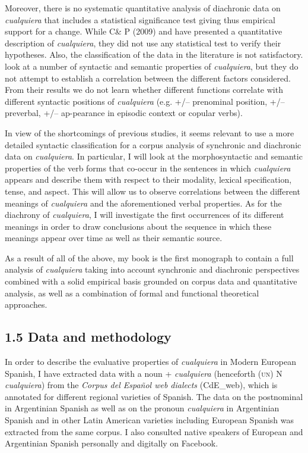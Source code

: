 \documentclass[output=paper]{langscibook}
\begin{document}
  Moreover, there is no systematic quantitative analysis of diachronic data on \textit{cualquiera} that includes a statistical significance test giving thus empirical support for a change. While C\& P (2009) and \citet{AloniPort2013} have presented a quantitative description of \textit{cualquiera}, they did not use any statistical test to verify their hypotheses. Also, the classification of the data in the literature is not satisfactory. \citet{AloniPort2013} look at a number of syntactic and semantic properties of \textit{cualquiera}, but they do not attempt to establish a correlation between the different factors considered. From their results we do not learn whether different functions correlate with different syntactic positions of \textit{cualquiera} (e.g. +/– prenominal position, +/– preverbal, +/– ap-pearance in episodic context or copular verbs). 

  In view of the shortcomings of previous studies, it seems relevant to use a more detailed syntactic classification for a corpus analysis of synchronic and diachronic data on \textit{cualquiera}. In particular, I will look at the morphosyntactic and semantic properties of the verb forms that co-occur in the sentences in which \textit{cualquiera} appears and describe them with respect to their modality, lexical specification, tense, and aspect. This will allow us to observe correlations between the different meanings of \textit{cualquiera} and the aforementioned verbal properties. As for the diachrony of \textit{cualquiera}, I will investigate the first occurrences of its different meanings in order to draw conclusions about the sequence in which these meanings appear over time as well as their semantic source.

  As a result of all of the above, my book is the first monograph to contain a full analysis of \textit{cualquiera} taking into account synchronic and diachronic perspectives combined with a solid empirical basis grounded on corpus data and quantitative analysis, as well as a combination of formal and functional theoretical approaches.

\subsection{1.5 Data and methodology}

In order to describe the evaluative properties of \textit{cualquiera} in Modern European Spanish, I have extracted data with a noun + \textit{cualquiera} (henceforth (\textsc{un)} N \textit{cualquiera}) from the \textit{Corpus del Español web dialects} (CdE\_web), which is annotated for different regional varieties of Spanish. The data on the postnominal in Argentinian Spanish as well as on the pronoun \textit{cualquiera} in Argentinian Spanish and in other Latin American varieties including European Spanish was extracted from the same corpus. I also consulted native speakers of European and Argentinian Spanish personally and digitally on Facebook.
\end{document}
